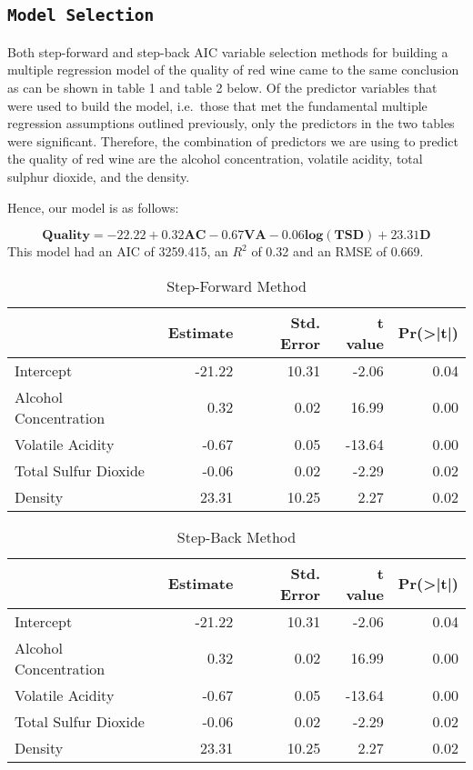 \documentclass[letterpaper,8pt,twocolumn,twoside,]{pinp}
\begin{document}
\hypertarget{model-selection}{%
\subsection{\texorpdfstring{\texttt{Model\ Selection}}{Model Selection}}\label{model-selection}}

Both step-forward and step-back AIC variable selection methods for
building a multiple regression model of the quality of red wine came to
the same conclusion as can be shown in table 1 and table 2 below. Of the
predictor variables that were used to build the model, i.e.~those that
met the fundamental multiple regression assumptions outlined previously,
only the predictors in the two tables were significant. Therefore, the
combination of predictors we are using to predict the quality of red
wine are the alcohol concentration, volatile acidity, total sulphur
dioxide, and the density.

Hence, our model is as follows:

\[
\mathbf{Quality = -22.22 + 0.32AC -0.67VA - 0.06log(TSD) + 23.31D}
\] This model had an AIC of 3259.415, an \(R^2\) of 0.32 and an RMSE of
0.669.

\begin{table}[!h]

\caption{\label{tab:unnamed-chunk-2}Step-Forward Method}
\centering
\begin{tabular}[t]{lrrrr}
\toprule
  & Estimate & Std. Error & t value & Pr(>|t|)\\
\midrule
Intercept & -21.22 & 10.31 & -2.06 & 0.04\\
Alcohol Concentration & 0.32 & 0.02 & 16.99 & 0.00\\
Volatile Acidity & -0.67 & 0.05 & -13.64 & 0.00\\
Total Sulfur Dioxide & -0.06 & 0.02 & -2.29 & 0.02\\
Density & 23.31 & 10.25 & 2.27 & 0.02\\
\bottomrule
\end{tabular}
\end{table}

\begin{table}[!h]

\caption{\label{tab:unnamed-chunk-2}Step-Back Method}
\centering
\begin{tabular}[t]{lrrrr}
\toprule
  & Estimate & Std. Error & t value & Pr(>|t|)\\
\midrule
Intercept & -21.22 & 10.31 & -2.06 & 0.04\\
Alcohol Concentration & 0.32 & 0.02 & 16.99 & 0.00\\
Volatile Acidity & -0.67 & 0.05 & -13.64 & 0.00\\
Total Sulfur Dioxide & -0.06 & 0.02 & -2.29 & 0.02\\
Density & 23.31 & 10.25 & 2.27 & 0.02\\
\bottomrule
\end{tabular}
\end{table}
\end{document}
